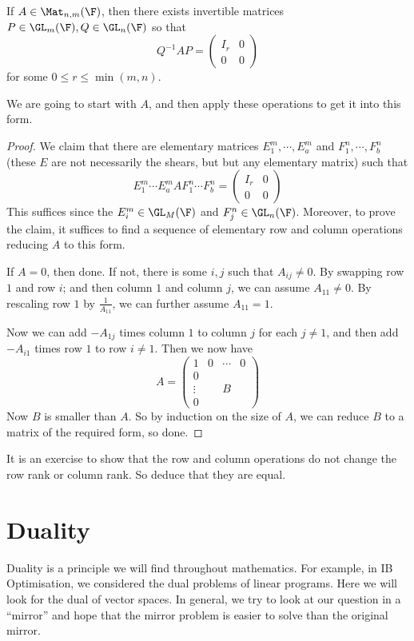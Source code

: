 \documentclass[a4paper]{article}
\begin{document}
\begin{prop}
  If $A\in \Mat_{n, m}(\F)$, then there exists invertible matrices $P \in \GL_m(\F), Q\in \GL_n(\F)$ so that
  \[
    Q^{-1}AP =
    \begin{pmatrix}
      I_r & 0\\
      0 & 0
    \end{pmatrix}
  \]
  for some $0 \leq r \leq \min(m, n)$.
\end{prop}

We are going to start with $A$, and then apply these operations to get it into this form.

\begin{proof}
  We claim that there are elementary matrices $E_1^m, \cdots, E_a^m$ and $F_1^n, \cdots, F_b^n$ (these $E$ are not necessarily the shears, but but any elementary matrix) such that
  \[
    E_1^m \cdots E_a^m AF_1^n \cdots F_b^n =
    \begin{pmatrix}
      I_r & 0\\
      0 & 0
    \end{pmatrix}
  \]
  This suffices since the $E_i^m \in \GL_M(\F)$ and $F_j^n \in \GL_n(\F)$. Moreover, to prove the claim, it suffices to find a sequence of elementary row and column operations reducing $A$ to this form.

  If $A = 0$, then done. If not, there is some $i, j$ such that $A_{ij} \not= 0$. By swapping row $1$ and row $i$; and then column $1$ and column $j$, we can assume $A_{11} \not= 0$. By rescaling row $1$ by $\frac{1}{A_{11}}$, we can further assume $A_{11} = 1$.

  Now we can add $-A_{1j}$ times column $1$ to column $j$ for each $j \not= 1$, and then add $-A_{i1}$ times row $1$ to row $i \not= 1$. Then we now have
  \[
    A =
    \begin{pmatrix}
      1 & 0 & \cdots & 0\\
      0 \\
      \vdots & & B\\
      0 &
    \end{pmatrix}
  \]
  Now $B$ is smaller than $A$. So by induction on the size of $A$, we can reduce $B$ to a matrix of the required form, so done.
\end{proof}
It is an exercise to show that the row and column operations do not change the row rank or column rank. So deduce that they are equal.

\section{Duality}
Duality is a principle we will find throughout mathematics. For example, in IB Optimisation, we considered the dual problems of linear programs. Here we will look for the dual of vector spaces. In general, we try to look at our question in a ``mirror'' and hope that the mirror problem is easier to solve than the original mirror.
\end{document}
